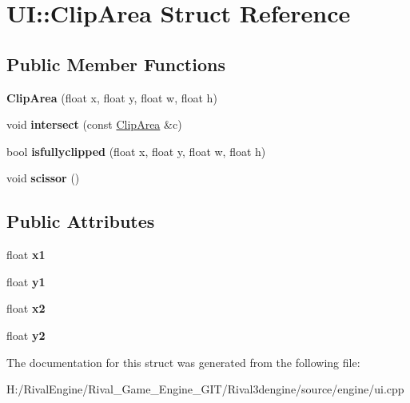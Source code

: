 \hypertarget{struct_u_i_1_1_clip_area}{}\section{UI\+:\+:Clip\+Area Struct Reference}
\label{struct_u_i_1_1_clip_area}
\subsection*{Public Member Functions}
\begin{DoxyCompactItemize}
\item 
\mbox{\label{struct_u_i_1_1_clip_area_a247be978a985f4ce3c888408b32cbb27}} 
{\bfseries Clip\+Area} (float x, float y, float w, float h)
\item 
\mbox{\label{struct_u_i_1_1_clip_area_a952b80fb754ab2f125f866d220e11eb5}} 
void {\bfseries intersect} (const \hyperlink{struct_u_i_1_1_clip_area}{Clip\+Area} \&c)
\item 
\mbox{\label{struct_u_i_1_1_clip_area_a99c032b211963549d68d2766fdfa09d4}} 
bool {\bfseries isfullyclipped} (float x, float y, float w, float h)
\item 
\mbox{\label{struct_u_i_1_1_clip_area_ac5c1de036a6a07160610e3eb4fac3300}} 
void {\bfseries scissor} ()
\end{DoxyCompactItemize}
\subsection*{Public Attributes}
\begin{DoxyCompactItemize}
\item 
\mbox{\label{struct_u_i_1_1_clip_area_a882ffbd6f99aba6a277c0d6ac2c59c60}} 
float {\bfseries x1}
\item 
\mbox{\label{struct_u_i_1_1_clip_area_a211e701ae907cc6777f34b9d246dfc62}} 
float {\bfseries y1}
\item 
\mbox{\label{struct_u_i_1_1_clip_area_aacea0e7e1d9308a22589087097e62a28}} 
float {\bfseries x2}
\item 
\mbox{\label{struct_u_i_1_1_clip_area_abb042f6c63a32d35ce44efee4124177c}} 
float {\bfseries y2}
\end{DoxyCompactItemize}


The documentation for this struct was generated from the following file\+:\begin{DoxyCompactItemize}
\item 
H\+:/\+Rival\+Engine/\+Rival\+\_\+\+Game\+\_\+\+Engine\+\_\+\+G\+I\+T/\+Rival3dengine/source/engine/ui.\+cpp\end{DoxyCompactItemize}
